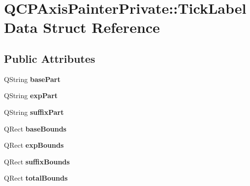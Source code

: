 \hypertarget{structQCPAxisPainterPrivate_1_1TickLabelData}{}\section{Q\+C\+P\+Axis\+Painter\+Private\+:\+:Tick\+Label\+Data Struct Reference}
\label{structQCPAxisPainterPrivate_1_1TickLabelData}
\subsection*{Public Attributes}
\begin{DoxyCompactItemize}
\item 
Q\+String {\bfseries base\+Part}\hypertarget{structQCPAxisPainterPrivate_1_1TickLabelData_ad65b76a5cafc412179a20b5d79809fc4}{}\label{structQCPAxisPainterPrivate_1_1TickLabelData_ad65b76a5cafc412179a20b5d79809fc4}

\item 
Q\+String {\bfseries exp\+Part}\hypertarget{structQCPAxisPainterPrivate_1_1TickLabelData_a09692e4ea092137278b4ac051d5fdf2b}{}\label{structQCPAxisPainterPrivate_1_1TickLabelData_a09692e4ea092137278b4ac051d5fdf2b}

\item 
Q\+String {\bfseries suffix\+Part}\hypertarget{structQCPAxisPainterPrivate_1_1TickLabelData_a3cbf21c6411730a318f8d2287b77d840}{}\label{structQCPAxisPainterPrivate_1_1TickLabelData_a3cbf21c6411730a318f8d2287b77d840}

\item 
Q\+Rect {\bfseries base\+Bounds}\hypertarget{structQCPAxisPainterPrivate_1_1TickLabelData_aac1047ae6ab8e9f5a42923082aabfff5}{}\label{structQCPAxisPainterPrivate_1_1TickLabelData_aac1047ae6ab8e9f5a42923082aabfff5}

\item 
Q\+Rect {\bfseries exp\+Bounds}\hypertarget{structQCPAxisPainterPrivate_1_1TickLabelData_a6722d2bcefb93011e9dc42301b966846}{}\label{structQCPAxisPainterPrivate_1_1TickLabelData_a6722d2bcefb93011e9dc42301b966846}

\item 
Q\+Rect {\bfseries suffix\+Bounds}\hypertarget{structQCPAxisPainterPrivate_1_1TickLabelData_aa286a44422223bd4f0b044cc822079f6}{}\label{structQCPAxisPainterPrivate_1_1TickLabelData_aa286a44422223bd4f0b044cc822079f6}

\item 
Q\+Rect {\bfseries total\+Bounds}\hypertarget{structQCPAxisPainterPrivate_1_1TickLabelData_afbb3163cf4c628914f1b703945419ea5}{}\label{structQCPAxisPainterPrivate_1_1TickLabelData_afbb3163cf4c628914f1b703945419ea5}


\end{DoxyCompactItemize}
